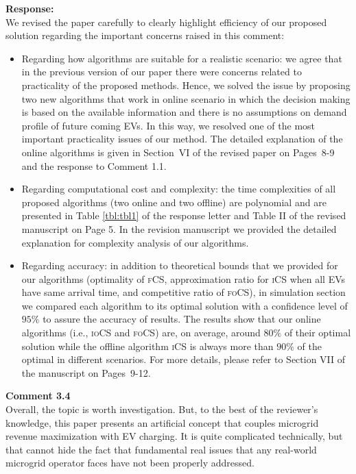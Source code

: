 \documentclass[11pt]{article}
\newcommand{\focs}{\textsc{foCS}\xspace}
\newcommand{\iocs}{\textsc{ioCS}\xspace}
\newcommand{\fcs}{\textsc{fCS}\xspace}
\newcommand{\ics}{\textsc{iCS}\xspace}
\begin{document}
\vspace{7mm}
\noindent\textbf{Response:}\\
We revised the paper carefully to clearly highlight efficiency of our proposed solution regarding the important concerns raised in this comment: 
\begin{itemize}
	\item Regarding how algorithms are suitable for a realistic scenario: we agree that in the previous version of our paper there were concerns related to practicality of the proposed methods. Hence, we solved the issue by proposing two new algorithms that work in online scenario in which the decision making is based on the available information and there is no assumptions on demand profile of future coming EVs. In this way, we resolved one of the most important practicality issues of our method. The detailed explanation of the online algorithms is given in Section~VI of the revised paper on Pages~8-9 and the response to Comment 1.1. 
	\item Regarding computational cost and complexity: the time complexities of all proposed algorithms (two online and two offline) are polynomial and are presented in Table \ref{tbl:tbl1} of the response letter and Table II of the revised manuscript on Page 5. In the revision manuscript we provided the detailed explanation for complexity analysis of our algorithms. 
	

	\item Regarding accuracy: in addition to theoretical bounds that we provided for our algorithms (optimality of \fcs, approximation ratio for \ics when all EVs have same arrival time, and competitive ratio of \focs), in simulation section we compared each algorithm to its optimal solution with a confidence level of $95\%$ to assure the accuracy of results. The results show that our online algorithms (i.e., \iocs and \focs) are, on average, around $80\%$ of their optimal solution while the offline algorithm \ics is always more than $90\%$ of the optimal in different scenarios. For more details, please refer to Section VII of the manuscript on Pages~9-12.
\end{itemize}

\vspace{5mm}
{\color{blue}
\noindent\textbf{Comment 3.4}\\
Overall, the topic is worth investigation. But, to the best of the reviewer's knowledge, this paper presents an artificial concept that couples microgrid revenue maximization with EV charging. It is quite complicated technically, but that cannot hide the fact that fundamental real issues that any real-world microgrid operator faces have not been properly addressed.}
\end{document}
